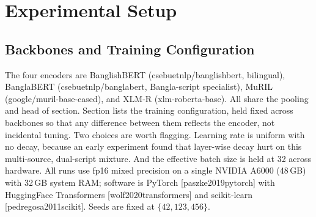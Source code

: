 \documentclass[11pt,a4paper]{article}
\def\citep#1{[#1]}%
\def\Cref#1{Section}%
\def\cref#1{section}%
\def\texttt#1{#1}%
\begin{document}
\section{Experimental Setup}
\label{sec:setup}

\subsection{Backbones and Training Configuration}
\label{sec:config}

The four encoders are BanglishBERT (\texttt{csebuetnlp/\allowbreak banglishbert}, bilingual), BanglaBERT (\texttt{csebuetnlp/\allowbreak banglabert}, Bangla-script specialist), MuRIL (\texttt{google/\allowbreak muril-base-cased}), and XLM-R (\texttt{xlm-roberta-base}). All share the pooling and head of \cref{sec:head}. \Cref{tab:hparams} lists the training configuration, held fixed across backbones so that any difference between them reflects the encoder, not incidental tuning. Two choices are worth flagging. Learning rate is uniform with no decay, because an early experiment found that layer-wise decay hurt on this multi-source, dual-script mixture. And the effective batch size is held at 32 across hardware. All runs use fp16 mixed precision on a single NVIDIA A6000 (48\,GB) with 32\,GB system RAM; software is PyTorch \citep{paszke2019pytorch} with HuggingFace Transformers \citep{wolf2020transformers} and scikit-learn \citep{pedregosa2011scikit}. Seeds are fixed at $\{42, 123, 456\}$.
\end{document}
